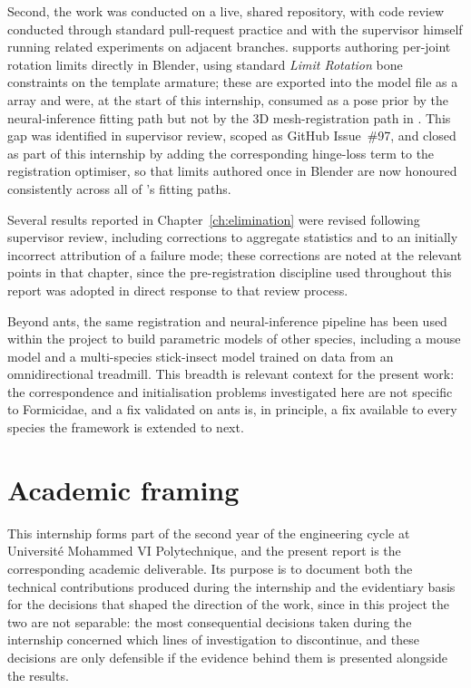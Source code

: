 Second, the work was conducted on a live, shared repository, with code review
conducted through standard pull-request practice and with the supervisor
himself running related experiments on adjacent branches. 
supports authoring per-joint rotation limits directly in Blender, using
standard \emph{Limit Rotation} bone constraints on the template armature;
these are exported into the model file as a  array and
were, at the start of this internship, consumed as a pose prior by the
neural-inference fitting path but not by the 3D mesh-registration path in
. This gap was identified in supervisor review, scoped as
GitHub Issue~\#97, and closed as part of this internship by adding the
corresponding hinge-loss term to the registration optimiser, so that limits
authored once in Blender are now honoured consistently across all of
's fitting paths.

Several results reported in Chapter~\ref{ch:elimination} were revised
following supervisor review, including corrections to aggregate statistics
and to an initially incorrect attribution of a failure mode; these corrections
are noted at the relevant points in that chapter, since the pre-registration
discipline used throughout this report was adopted in direct response to that
review process.

Beyond ants, the same registration and neural-inference pipeline has been used
within the project to build parametric models of other species, including a
mouse model and a multi-species stick-insect model trained on data from an
omnidirectional treadmill. This breadth is relevant context for the present
work: the correspondence and initialisation problems investigated here are not
specific to Formicidae, and a fix validated on ants is, in principle, a fix
available to every species the framework is extended to next.

\section{Academic framing}

This internship forms part of the second year of the engineering cycle at
Université Mohammed VI Polytechnique, and the present report is the
corresponding academic deliverable. Its purpose is to document both the
technical contributions produced during the internship and the evidentiary
basis for the decisions that shaped the direction of the work, since in this
project the two are not separable: the most consequential decisions taken
during the internship concerned which lines of investigation to discontinue,
and these decisions are only defensible if the evidence behind them is
presented alongside the results.

